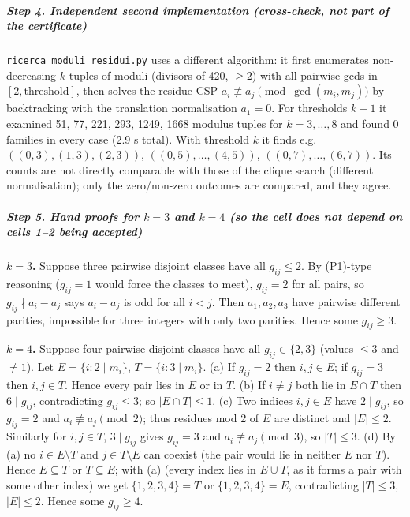 \documentclass[11pt,a4paper]{article}
\begin{document}
\subparagraph{Step 4. Independent second implementation (cross-check,
not part of the
certificate)}\label{step-4.-independent-second-implementation-cross-check-not-part-of-the-certificate}

\texttt{ricerca\_moduli\_residui.py} uses a different algorithm: it
first enumerates non-decreasing \(k\)-tuples of moduli (divisors of 420,
\(\ge2\)) with all pairwise gcds in \([2,\text{threshold}]\), then
solves the residue CSP \(a_i\not\equiv a_j \pmod{\gcd(m_i,m_j)}\) by
backtracking with the translation normalisation \(a_1=0\). For
thresholds \(k-1\) it examined 51, 77, 221, 293, 1249, 1668 modulus
tuples for \(k=3,\dots,8\) and found 0 families in every case (2.9 s
total). With threshold \(k\) it finds e.g.~\(((0,3),(1,3),(2,3))\),
\(((0,5),\dots,(4,5))\), \(((0,7),\dots,(6,7))\). Its counts are not
directly comparable with those of the clique search (different
normalisation); only the zero/non-zero outcomes are compared, and they
agree.

\subparagraph{\texorpdfstring{Step 5. Hand proofs for \(k=3\) and
\(k=4\) (so the cell does not depend on cells 1--2 being
accepted)}{Step 5. Hand proofs for k=3 and k=4 (so the cell does not depend on cells 1--2 being accepted)}}\label{step-5.-hand-proofs-for-k3-and-k4-so-the-cell-does-not-depend-on-cells-12-being-accepted}

\textbf{\(k=3\).} Suppose three pairwise disjoint classes have all
\(g_{ij}\le 2\). By (P1)-type reasoning (\(g_{ij}=1\) would force the
classes to meet), \(g_{ij}=2\) for all pairs, so \(g_{ij}\nmid a_i-a_j\)
says \(a_i-a_j\) is odd for all \(i<j\). Then \(a_1,a_2,a_3\) have
pairwise different parities, impossible for three integers with only two
parities. Hence some \(g_{ij}\ge3\).

\textbf{\(k=4\).} Suppose four pairwise disjoint classes have all
\(g_{ij}\in\{2,3\}\) (values \(\le3\) and \(\ne1\)). Let
\(E=\{i: 2\mid m_i\}\), \(T=\{i:3\mid m_i\}\). (a) If \(g_{ij}=2\) then
\(i,j\in E\); if \(g_{ij}=3\) then \(i,j\in T\). Hence every pair lies
in \(E\) or in \(T\). (b) If \(i\ne j\) both lie in \(E\cap T\) then
\(6\mid g_{ij}\), contradicting \(g_{ij}\le3\); so \(|E\cap T|\le1\).
(c) Two indices \(i,j\in E\) have \(2\mid g_{ij}\), so \(g_{ij}=2\) and
\(a_i\not\equiv a_j\pmod 2\); thus residues mod 2 of \(E\) are distinct
and \(|E|\le2\). Similarly for \(i,j\in T\), \(3\mid g_{ij}\) gives
\(g_{ij}=3\) and \(a_i\not\equiv a_j \pmod 3\), so \(|T|\le3\). (d) By
(a) no \(i\in E\setminus T\) and \(j\in T\setminus E\) can coexist (the
pair would lie in neither \(E\) nor \(T\)). Hence \(E\subseteq T\) or
\(T\subseteq E\); with (a) (every index lies in \(E\cup T\), as it forms
a pair with some other index) we get \(\{1,2,3,4\}=T\) or
\(\{1,2,3,4\}=E\), contradicting \(|T|\le3\), \(|E|\le2\). Hence some
\(g_{ij}\ge4\).
\end{document}
